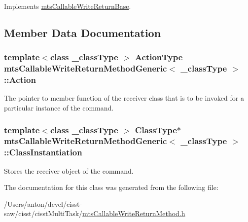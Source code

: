 Implements \hyperlink{classmts_callable_write_return_base_a56bfb09f0ebff160d2930f1c8521fe0e}{mts\+Callable\+Write\+Return\+Base}.



\subsection{Member Data Documentation}
\hypertarget{classmts_callable_write_return_method_generic_a26ed7c8f096968628c889c74c330ef56}{}
\subsubsection[{Action}]{\setlength{\rightskip}{0pt plus 5cm}template$<$class \+\_\+class\+Type $>$ {\bf Action\+Type} {\bf mts\+Callable\+Write\+Return\+Method\+Generic}$<$ \+\_\+class\+Type $>$\+::Action\hspace{0.3cm}{\ttfamily [protected]}}\label{classmts_callable_write_return_method_generic_a26ed7c8f096968628c889c74c330ef56}
The pointer to member function of the receiver class that is to be invoked for a particular instance of the command. \hypertarget{classmts_callable_write_return_method_generic_a8439ed2ecdee526070cb9f7d34cd100b}{}
\subsubsection[{Class\+Instantiation}]{\setlength{\rightskip}{0pt plus 5cm}template$<$class \+\_\+class\+Type $>$ {\bf Class\+Type}$\ast$ {\bf mts\+Callable\+Write\+Return\+Method\+Generic}$<$ \+\_\+class\+Type $>$\+::Class\+Instantiation\hspace{0.3cm}{\ttfamily [protected]}}\label{classmts_callable_write_return_method_generic_a8439ed2ecdee526070cb9f7d34cd100b}
Stores the receiver object of the command. 

The documentation for this class was generated from the following file\+:\begin{DoxyCompactItemize}
\item 
/\+Users/anton/devel/cisst-\/saw/cisst/cisst\+Multi\+Task/\hyperlink{mts_callable_write_return_method_8h}{mts\+Callable\+Write\+Return\+Method.\+h}\end{DoxyCompactItemize}
